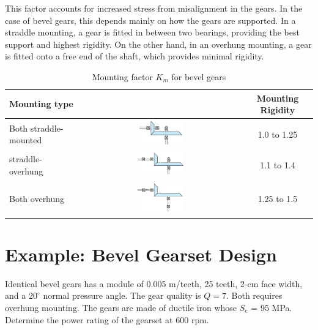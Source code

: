 \documentclass[a4paper,openany]{tufte-book}
\begin{document}
This factor accounts for increased stress from misalignment in the gears. In the case of bevel gears, this depends mainly on how the gears are supported. In a straddle mounting, a gear is fitted in between two bearings, providing the best support and highest rigidity. On the other hand, in an overhung mounting, a gear is fitted onto a free end of the shaft, which provides minimal rigidity.

\begin{table}[htbp]
\caption{\label{tab: bevel mounting factor}Mounting factor \(K_m\) for bevel gears}
  \centering
  \begin{tabular}{lcc}
    \toprule
    Mounting type & & Mounting Rigidity \\
    \midrule
    Both straddle-mounted & \includegraphics[width=0.3\textwidth]{pictures/Gears/both-straddle} & 1.0 to 1.25 \\
    straddle-overhung & \includegraphics[width=0.3\textwidth]{pictures/Gears/straddle-overhung} & 1.1 to 1.4 \\
    Both overhung & \includegraphics[width=0.3\textwidth]{pictures/Gears/both-overhung} & 1.25 to 1.5 \\
    \bottomrule
  \end{tabular}
\end{table}

\section{Example: Bevel Gearset Design}
\label{sec:orgab92ce2}

Identical bevel gears has a module of 0.005 m/teeth, 25 teeth, 2-cm face width, and a \(20^{\circ}\) normal pressure angle. The gear quality is \(Q = 7\). Both requires overhung mounting. The gears are made of ductile iron whose \(S_{e}\) = 95 MPa. Determine the power rating of the gearset at 600 rpm.
\end{document}
